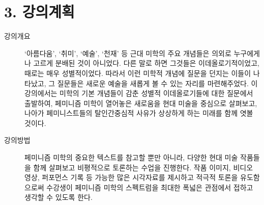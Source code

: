 \documentclass{article}
\begin{document}
\newpage
\section{3. 강의계획}
\medskip
\begin{description}
    \item[강의개요] `아름다움', `취미', `예술', `천재' 등 근대 미학의 주요 개념들은 의외로 누구에게나 고르게 분배된 것이 아니었다. 다른 말로 하면 그것들은 이데올로기적이었고, 때로는 매우 성별적이었다. 따라서 이런 미학적 개념에 질문을 던지는 이들이 나타났고, 그 질문들은 새로운 예술을 새롭게 볼 수 있는 자리를 마련해주었다. 이 강의에서는 미학의 기본 개념들이 감춘 성별적 이데올로기들에 대한 질문에서 출발하여, 페미니즘 미학이 열어놓은 새로움을 현대 미술을 중심으로 살펴보고, 나아가 페미니스트들의 탈인간중심적 사유가 상상하게 하는 미래를 함께 엿볼 것이다.
    \item[강의방법] 페미니즘 미학의 중요한 텍스트를 참고할 뿐만 아니라, 다양한 현대 미술 작품들을 함께 살펴보고 비평적으로 토론하는 수업을 진행한다. 작품 이미지, 비디오 영상, 퍼포먼스 기록 등 가능한 많은 시각자료를 제시하고 적극적 토론을 유도함으로써 수강생이 페미니즘 미학의 스펙트럼을 최대한 폭넓은 관점에서 접하고 생각할 수 있도록 한다.
\end{description}
\medskip
\end{document}
